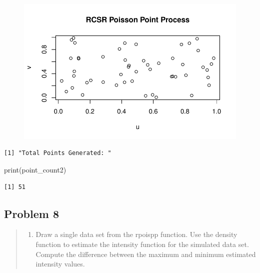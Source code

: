 \documentclass[
  letterpaper,
  DIV=11,
  numbers=noendperiod]{scrartcl}
\newenvironment{Shaded}{\begin{snugshade}}{\end{snugshade}}
\newcommand{\FunctionTok}[1]{\textcolor[rgb]{0.28,0.35,0.67}{#1}}
\newcommand{\NormalTok}[1]{\textcolor[rgb]{0.00,0.23,0.31}{#1}}
\newcommand{\OtherTok}[1]{\textcolor[rgb]{0.00,0.23,0.31}{#1}}
\newcommand{\SpecialCharTok}[1]{\textcolor[rgb]{0.37,0.37,0.37}{#1}}
\newcommand{\StringTok}[1]{\textcolor[rgb]{0.13,0.47,0.30}{#1}}
\providecommand{\tightlist}{%
  \setlength{\itemsep}{0pt}\setlength{\parskip}{0pt}}\usepackage{longtable,booktabs,array}
\begin{document}
\begin{figure}[H]

{\centering \includegraphics{robby_homework1_files/figure-pdf/unnamed-chunk-7-1.pdf}

}

\end{figure}

\begin{Shaded}
\end{Shaded}

\begin{verbatim}
[1] "Total Points Generated: "
\end{verbatim}

\begin{Shaded}
\begin{Highlighting}[]
\FunctionTok{print}\NormalTok{(point\_count2)}
\end{Highlighting}
\end{Shaded}

\begin{verbatim}
[1] 51
\end{verbatim}

\hypertarget{problem-8}{%
\subsection{Problem 8}\label{problem-8}}

\begin{quote}
\begin{enumerate}
\def\labelenumi{\arabic{enumi}.}
\tightlist
\item
  Draw a single data set from the rpoispp function. Use the density
  function to estimate the intensity function for the simulated data
  set. Compute the difference between the maximum and minimum estimated
  intensity values.
\end{enumerate}
\end{quote}
\end{document}
